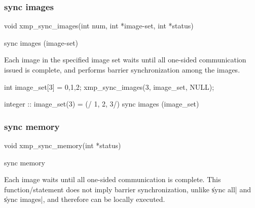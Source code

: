 

\subsubsection{sync images}

\begin{XCexample}
void xmp_sync_images(int num, int *image-set, int *status)
\end{XCexample}

\begin{XFexample}
sync images (image-set)
\end{XFexample}

Each image in the specified image set waits until all one-sided
communication issued is complete, and performs barrier synchronization
among the images.

\begin{XCexample}
int image_set[3] = {0,1,2};
xmp_sync_images(3, image_set, NULL);
\end{XCexample}

\begin{XFexample}
integer :: image_set(3) = (/ 1, 2, 3/)
sync images (image_set)
\end{XFexample}


\subsubsection{sync memory}

\begin{XCexample}
void xmp_sync_memory(int *status)
\end{XCexample}

\begin{XFexample}
sync memory
\end{XFexample}

Each image waits until all one-sided communication is complete. This
function/statement does not imply barrier synchronization, unlike
\|sync all| and \|sync images|, and therefore can be locally executed. 




